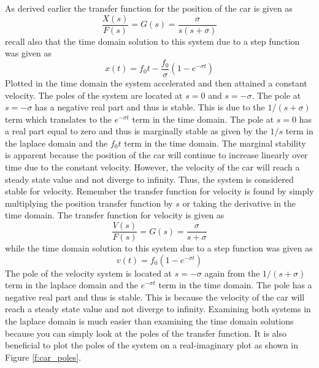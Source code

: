 As derived earlier the transfer function for the position of the car is given as 
\begin{equation}
    \frac{X(s)}{F(s)}= G(s) = \frac{\sigma}{s(s+\sigma)}
\end{equation}
recall also that the time domain solution to this system due to a step function was given as 
\begin{equation}
    x(t) = f_0 t - \frac{f_0}{\sigma} (1 - e^{-\sigma t})
\end{equation}
Plotted in the time domain the system accelerated and then attained a constant velocity. The poles of the system are located at $s=0$ and $s=-\sigma$. The pole at $s=-\sigma$ has a negative real part and thus is stable. This is due to the $1/(s+\sigma)$ term which translates to the $e^{-\sigma t}$ term in the time domain. The pole at $s=0$ has a real part equal to zero and thus is marginally stable as given by the $1/s$ term in the laplace domain and the $f_0 t$ term in the time domain. The marginal stability is apparent because the position of the car will continue to increase linearly over time due to the constant velocity. However, the velocity of the car will reach a steady state value and not diverge to infinity. Thus, the system is considered stable for velocity. Remember the transfer function for velocity is found by simply multiplying the position transfer function by $s$ or taking the derivative in the time domain. The transfer function for velocity is given as
\begin{equation}
    \frac{V(s)}{F(s)}= G(s) = \frac{\sigma}{s+\sigma}
\end{equation}
while the time domain solution to this system due to a step function was given as
\begin{equation}
    v(t) = f_0 (1 - e^{-\sigma t})
\end{equation}
The pole of the velocity system is located at $s=-\sigma$ again from the $1/(s+\sigma)$ term in the laplace domain and the $e^{-\sigma t}$ term in the time domain. The pole has a negative real part and thus is stable. This is because the velocity of the car will reach a steady state value and not diverge to infinity. Examining both systems in the laplace domain is much easier than examining the time domain solutions because you can simply look at the poles of the transfer function. It is also beneficial to plot the poles of the system on a real-imaginary plot as shown in Figure \ref{f:car_poles}.
